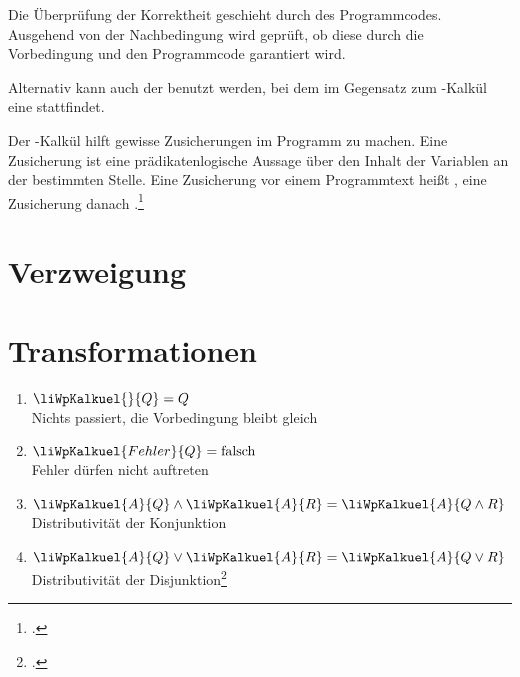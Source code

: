 \documentclass{bschlangaul-haupt}
\let\wp=\liWpKalkuel
\begin{document}
Die Überprüfung der Korrektheit geschieht durch 
des Programmcodes. Ausgehend von der Nachbedingung wird geprüft, ob
diese durch die Vorbedingung und den Programmcode garantiert wird.

Alternativ kann auch der  benutzt werden, bei dem im
Gegensatz zum -Kalkül eine  stattfindet.

Der -Kalkül hilft gewisse Zusicherungen im Programm zu machen.
Eine Zusicherung ist eine prädikatenlogische Aussage über den Inhalt der
Variablen an der bestimmten Stelle. Eine Zusicherung vor einem
Programmtext heißt , eine Zusicherung danach
.\footcite{wiki:wp-kalkuel}

%

\section{Verzweigung}

\liWpErklaerungVerzweigung

\section{Transformationen}

\begin{enumerate}
\item $\wp{}{Q} = Q$ \\
Nichts passiert, die Vorbedingung bleibt gleich

\item $\wp{Fehler}{Q} = \text{falsch}$ \\
Fehler dürfen nicht auftreten

\item $\wp{A}{Q} \land \wp{A}{R} = \wp{A}{Q \land R}$ \\
Distributivität der Konjunktion

\item $\wp{A}{Q} \lor \wp{A}{R} = \wp{A}{Q \lor R}$ \\
Distributivität der Disjunktion\footcite{wiki:wp-kalkuel}
\end{enumerate}

%
\end{document}
